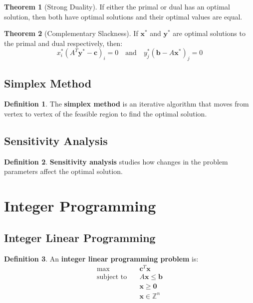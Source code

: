 \documentclass[11pt]{article}
\theoremstyle{definition}
\newtheorem{definition}{Definition}[section]
\newtheorem{theorem}{Theorem}[section]
\begin{document}
\begin{theorem}[Strong Duality]
If either the primal or dual has an optimal solution, then both have optimal solutions and their optimal values are equal.
\end{theorem}

\begin{theorem}[Complementary Slackness]
If $\mathbf{x}^*$ and $\mathbf{y}^*$ are optimal solutions to the primal and dual respectively, then:
$$x_i^* (A^T \mathbf{y}^* - \mathbf{c})_i = 0 \quad \text{and} \quad y_j^* (\mathbf{b} - A\mathbf{x}^*)_j = 0$$
\end{theorem}

\subsection{Simplex Method}
\begin{definition}
The \textbf{simplex method} is an iterative algorithm that moves from vertex to vertex of the feasible region to find the optimal solution.
\end{definition}

\subsection{Sensitivity Analysis}
\begin{definition}
\textbf{Sensitivity analysis} studies how changes in the problem parameters affect the optimal solution.
\end{definition}

\section{Integer Programming}

\subsection{Integer Linear Programming}
\begin{definition}
An \textbf{integer linear programming problem} is:
\begin{align}
\max \quad & \mathbf{c}^T \mathbf{x} \\
\text{subject to} \quad & A\mathbf{x} \leq \mathbf{b} \\
& \mathbf{x} \geq \mathbf{0} \\
& \mathbf{x} \in \mathbb{Z}^n
\end{align}
\end{definition}
\end{document}
